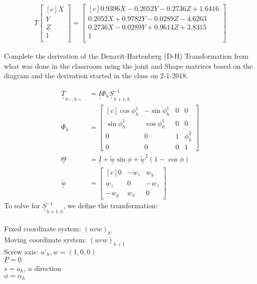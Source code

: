 \documentclass[onecolumn,10pt]{jhwhw}
\def\du#1{\underline{\underline{#1}}}
\begin{document}
\begin{align*}
T
\begin{bmatrix*}[c]
X \\
Y \\
Z \\
1 \\
\end{bmatrix*}
=
\begin{bmatrix*}[c]
0.9396 X -  0.2052 Y -  0.2736 Z +  1.6416 \\
0.2052 X +  0.9782 Y -  0.0289 Z -  4.6263 \\
0.2736 X -  0.0289 Y +  0.9614 Z +  3.8315 \\
                                         1 \\
\end{bmatrix*}
\end{align*}

\problem{}
Complete the derivation of the Denavit-Hartenberg (D-H) Transformation from what was done in the classroom using the joint and Shape matrices based on the diagram and the derivation started in the class on 2-1-2018.

\begin{align*}
\du{T}_{h-, h+} &= \du{I} \Phi_{h} \du{S}^{-1}_{h+1, h} \\
\Phi_{h} &=
\begin{bmatrix*}[c]
\cos \phi_h^1 & -\sin \phi_h^1 & 0 & 0 \\
\sin \phi_h^1 &  \cos \phi_h^1 & 0 & 0 \\
0 & 0 & 1 & \phi_h^2 \\
0 & 0 & 0 & 1
\end{bmatrix*} \\
\du{\Theta} &= \du{I} + \du{\widetilde{w}} \sin \phi + \du{\widetilde{w}}^2 \left ( 1 - \cos\phi \right ) \\
\du{\widetilde{w}} &=
\begin{bmatrix*}[c]
0 & -w_z & w_y \\
w_z & 0 & -w_z \\
-w_y & w_x & 0
\end{bmatrix*}
\end{align*}
To solve for $\du{S}^{-1}_{h+1, h}$, we define the transformation: \\
\\
Fixed coordinate system: $(u v w)_{h'}$ \\
Moving coordinate system: $(u v w)_{h+1}$ \\
Screw axis: $u'_h, w = (1, 0, 0)$ \\
$\underline{P} = \underline{0}$ \\
$s = a_h$, $u$ direction \\
$\phi = \alpha_h$
\end{document}
